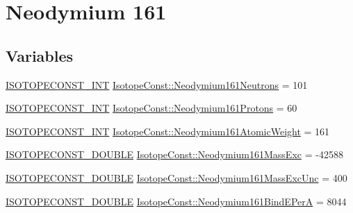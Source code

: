 \hypertarget{group___isotope_const-_neodymium-_nd161}{}\section{Neodymium 161}
\label{group___isotope_const-_neodymium-_nd161}
\subsection*{Variables}
\begin{DoxyCompactItemize}
\item 
\mbox{\hyperlink{group___isotope_const-_macros_ga5f18360b3e99483a35c32d789e62621c}{I\+S\+O\+T\+O\+P\+E\+C\+O\+N\+S\+T\+\_\+\+I\+NT}} \mbox{\hyperlink{group___isotope_const-_neodymium-_nd161_gafa066f0f43d39bf1ea6bc68bae5fb092}{Isotope\+Const\+::\+Neodymium161\+Neutrons}} = 101
\item 
\mbox{\hyperlink{group___isotope_const-_macros_ga5f18360b3e99483a35c32d789e62621c}{I\+S\+O\+T\+O\+P\+E\+C\+O\+N\+S\+T\+\_\+\+I\+NT}} \mbox{\hyperlink{group___isotope_const-_neodymium-_nd161_ga253b8d5e2abe22d20e736e8b932acbdc}{Isotope\+Const\+::\+Neodymium161\+Protons}} = 60
\item 
\mbox{\hyperlink{group___isotope_const-_macros_ga5f18360b3e99483a35c32d789e62621c}{I\+S\+O\+T\+O\+P\+E\+C\+O\+N\+S\+T\+\_\+\+I\+NT}} \mbox{\hyperlink{group___isotope_const-_neodymium-_nd161_gae7b35675e83458ca8c6c64e7095ab6db}{Isotope\+Const\+::\+Neodymium161\+Atomic\+Weight}} = 161
\item 
\mbox{\hyperlink{group___isotope_const-_macros_ga8f45a7272ce02c0b4c65c44636ed719a}{I\+S\+O\+T\+O\+P\+E\+C\+O\+N\+S\+T\+\_\+\+D\+O\+U\+B\+LE}} \mbox{\hyperlink{group___isotope_const-_neodymium-_nd161_ga1b6e3dd52a26cd768c4b1df06ff92725}{Isotope\+Const\+::\+Neodymium161\+Mass\+Exc}} = -\/42588
\item 
\mbox{\hyperlink{group___isotope_const-_macros_ga8f45a7272ce02c0b4c65c44636ed719a}{I\+S\+O\+T\+O\+P\+E\+C\+O\+N\+S\+T\+\_\+\+D\+O\+U\+B\+LE}} \mbox{\hyperlink{group___isotope_const-_neodymium-_nd161_ga4c585fe43ba3cb38960ebfc87d743387}{Isotope\+Const\+::\+Neodymium161\+Mass\+Exc\+Unc}} = 400
\item 
\mbox{\hyperlink{group___isotope_const-_macros_ga8f45a7272ce02c0b4c65c44636ed719a}{I\+S\+O\+T\+O\+P\+E\+C\+O\+N\+S\+T\+\_\+\+D\+O\+U\+B\+LE}} \mbox{\hyperlink{group___isotope_const-_neodymium-_nd161_gaaa28a016341d52839989eb7d92d3a68f}{Isotope\+Const\+::\+Neodymium161\+Bind\+E\+PerA}} = 8044
\item 

\end{DoxyCompactItemize}
